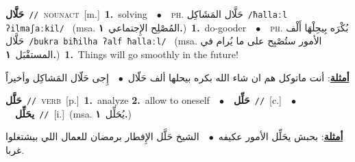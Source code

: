 \documentclass[10pt,a4paper,twoside]{article} %
\begin{document}
\begin{multicols}{2}
{\setlength\topsep{0pt}\textbf{\foreignlanguage{arabic}{حَلَّال}}\ {\color{gray}\texttt{//}\color{black}}\ \textsc{noun\textunderscore act}\ [m.]\ \textbf{1.}~solving\ \ $\bullet$\ \ \textsc{ph.} \color{gray} \foreignlanguage{arabic}{حَلَّال المَشَاكِل}\color{black}\ {\color{gray}\texttt{/{\sffamily ħallaːl ʔilmaʃaːkil}/}\color{black}}\ \color{gray} (msa. \foreignlanguage{arabic}{المُصْلِح الإِجتماعي}~\foreignlanguage{arabic}{\textbf{١.}})\color{black}\ \textbf{1.}~do-gooder\ \ $\bullet$\ \ \textsc{ph.} \color{gray} \foreignlanguage{arabic}{بُكْرَه بِيحِلْهَا أَلْف حَلَّال}\color{black}\ {\color{gray}\texttt{/{\sffamily bukra biħilha ʔalf ħallaːl}/}\color{black}}\ \color{gray} (msa. \foreignlanguage{arabic}{الأمور ستُصْبِح على ما يُرام في المستقْبَل}~\foreignlanguage{arabic}{\textbf{١.}})\color{black}\ \textbf{1.}~Things will go smoothly in the future!\  \begin{flushright}\color{gray}\foreignlanguage{arabic}{\textbf{\underline{\foreignlanguage{arabic}{أمثلة}}}: أنت ماتوكل هم ان شاء الله بكره بيحلها ألف حَلّال\ $\bullet$\ \  إِجى حَلّال المَشاكِل وأخيراً}\end{flushright}\color{black}} \vspace{2mm}

{\setlength\topsep{0pt}\textbf{\foreignlanguage{arabic}{حَلَّل}}\ {\color{gray}\texttt{//}\color{black}}\ \textsc{verb}\ [p.]\ \textbf{1.}~analyze  \textbf{2.}~allow to oneself\ \ $\bullet$\ \ \setlength\topsep{0pt}\textbf{\foreignlanguage{arabic}{حَلِّل}}\ {\color{gray}\texttt{//}\color{black}}\ [c.]\ \ $\bullet$\ \ \setlength\topsep{0pt}\textbf{\foreignlanguage{arabic}{يحَلِّل}}\ {\color{gray}\texttt{//}\color{black}}\ [i.]\ \color{gray}(msa. \foreignlanguage{arabic}{يُحَلِّل}~\foreignlanguage{arabic}{\textbf{١.}})\color{black}\  \begin{flushright}\color{gray}\foreignlanguage{arabic}{\textbf{\underline{\foreignlanguage{arabic}{أمثلة}}}: بحبش يحَلِّل الأمور عكيفه\ $\bullet$\ \  الشيخ حَلَّل الإِفطار برمضان للعمال اللي بيشتغلوا غربا.}\end{flushright}\color{black}} \vspace{2mm}


\end{multicols}
\end{document}
